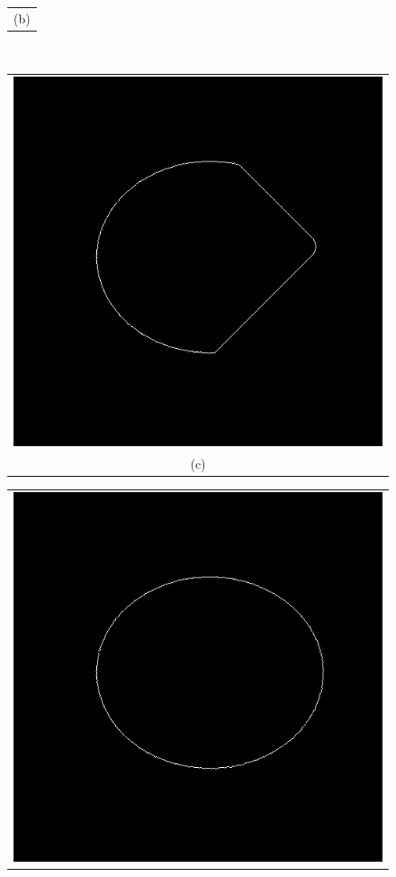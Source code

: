 \begin{figure}[h!]
\begin{minipage}{.49\textwidth}
\begin{tabular}{c}
(b)
\end{tabular}
\end{minipage}
\\
\begin{minipage}{.49\textwidth}
\begin{tabular}{c}
\includegraphics[width=.9\textwidth]{results/2D/circleZero1600} \\
(c)
\end{tabular}
\end{minipage}
\begin{minipage}{.49\textwidth}
\begin{tabular}{c}
\includegraphics[width=.9\textwidth]{results/2D/circleZero2200_full} \\

\end{tabular}
\end{minipage}
\end{figure}
